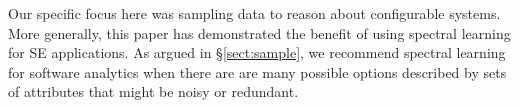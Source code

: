 \documentclass{sig-alternative}
\newcommand{\tion}[1]{\S\ref{sect:#1}}
\begin{document}
Our specific focus here was sampling data
to reason about configurable systems. More generally,
this paper has demonstrated the benefit of using
spectral learning for SE applications.  As argued in \tion{sample},
we recommend spectral learning  for software analytics when there are
are many possible options described by sets of attributes
that might be noisy or redundant.  



\vspace*{0.5mm}
 
 


\balance
  
\end{document}
